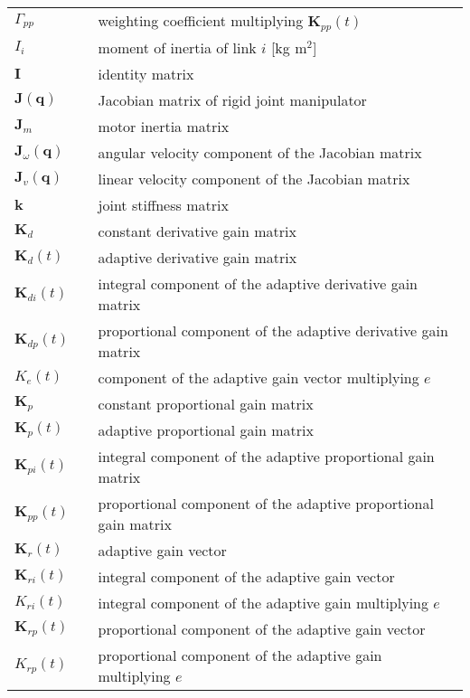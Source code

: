 \begin{longtable}[ht]{lll}
			$\Gamma_{pp}$   								&	 & weighting coefficient multiplying $\mathbf{K}_{pp}(t)$\\
			$I_{i}$												  &  & moment of inertia of link $i$ [kg m$^2$]\\
			$\mathbf{I}$										&  & identity matrix\\
			$\mathbf{J}(\mathbf{q})$				&  & Jacobian matrix of rigid joint manipulator\\
			$\mathbf{J}_{m}$								&  & motor inertia matrix\\
			$\mathbf{J}_{\omega}(\mathbf{q})$	&  & angular velocity component of the Jacobian matrix\\
			$\mathbf{J}_{v}(\mathbf{q})$		&  & linear velocity component of the Jacobian matrix\\
			$\mathbf{k}$										&  & joint stiffness matrix\\
			$\mathbf{K}_{d}$								&  & constant derivative gain matrix\\
			$\mathbf{K}_{d}(t)$							&  & adaptive derivative gain matrix\\
			$\mathbf{K}_{di}(t)$						&  & integral component of the adaptive derivative gain matrix\\
			$\mathbf{K}_{dp}(t)$						&  & proportional component of the adaptive derivative gain matrix\\
			$K_{e}(t)$											&  & component of the adaptive gain vector multiplying $e$\\			
			$\mathbf{K}_{p}$								&  & constant proportional gain matrix\\
			$\mathbf{K}_{p}(t)$							&  & adaptive proportional gain matrix\\
			$\mathbf{K}_{pi}(t)$						&  & integral component of the adaptive proportional gain matrix\\
			$\mathbf{K}_{pp}(t)$						&  & proportional component of the adaptive proportional gain matrix\\
			$\mathbf{K}_{r}(t)$							&  & adaptive gain vector\\
			$\mathbf{K}_{ri}(t)$						&  & integral component of the adaptive gain vector\\
			$K_{ri}(t)$											&  & integral component of the adaptive gain multiplying $e$\\
			$\mathbf{K}_{rp}(t)$						&  & proportional component of the adaptive gain vector\\
			$K_{rp}(t)$											&  & proportional component of the adaptive gain multiplying $e$\\

\end{longtable}
